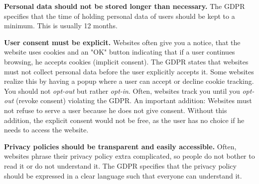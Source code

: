 \textbf{Personal data should not be stored longer than necessary.} The GDPR specifies that the time of holding personal data of
users should be kept to a minimum. This is usually 12 months.

\textbf{User consent must be explicit.} Websites often give you a notice, that the website uses cookies and an "OK" button
indicating that if a user continues browsing, he accepts cookies (implicit consent). The GDPR states
that websites must not collect personal data before the user explicitly accepts it. Some websites realize
this by having a popup where a user can accept or decline cookie tracking. You should not
\emph{opt-out} but rather \emph{opt-in}. Often, websites track you until you \emph{opt-out} (revoke consent) violating
the GDPR. An important addition: Websites must not refuse to serve a user because he does not give consent. Without this
addition, the explicit consent would not be free, as the user has no choice if he needs to access the website.

\textbf{Privacy policies should be transparent and easily accessible.} Often, websites phrase their privacy policy
extra complicated, so people do not bother to read it or do not understand it. The GDPR specifies that the privacy policy
should be expressed in a clear language such that everyone can understand it.

